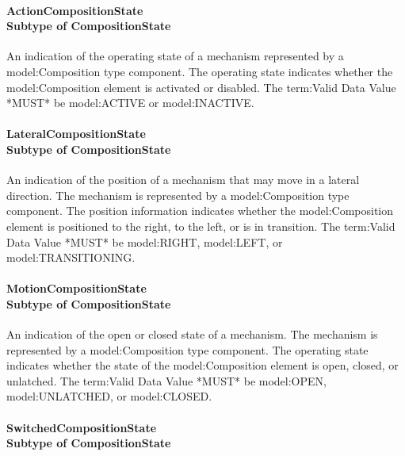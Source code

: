 \paragraph[ActionCompositionState]{ActionCompositionState \\ {\small Subtype of CompositionState}}\mbox{}
  \label{type:ActionCompositionState}

\FloatBarrier

An indication of the operating state of a mechanism represented by a {model:Composition} type component.
 The operating state indicates whether the {model:Composition} element is activated or disabled. 
 The {term:Valid Data Value} *MUST* be {model:ACTIVE} or {model:INACTIVE}.

\paragraph[LateralCompositionState]{LateralCompositionState \\ {\small Subtype of CompositionState}}\mbox{}
  \label{type:LateralCompositionState}

\FloatBarrier

An indication of the position of a mechanism that may move in a lateral direction.   The mechanism is represented by a {model:Composition} type component. 
 The position information indicates whether the {model:Composition} element is positioned to the right, to the left, or is in transition.  
 The {term:Valid Data Value} *MUST* be {model:RIGHT}, {model:LEFT}, or {model:TRANSITIONING}.

\paragraph[MotionCompositionState]{MotionCompositionState \\ {\small Subtype of CompositionState}}\mbox{}
  \label{type:MotionCompositionState}

\FloatBarrier

An indication of the open or closed state of a mechanism.   The mechanism is represented by a {model:Composition} type component. 
 The operating state indicates whether the state of the {model:Composition} element is open, closed, or unlatched.   
 The {term:Valid Data Value} *MUST* be {model:OPEN}, {model:UNLATCHED}, or {model:CLOSED}.

\paragraph[SwitchedCompositionState]{SwitchedCompositionState \\ {\small Subtype of CompositionState}}\mbox{}
  \label{type:SwitchedCompositionState}

